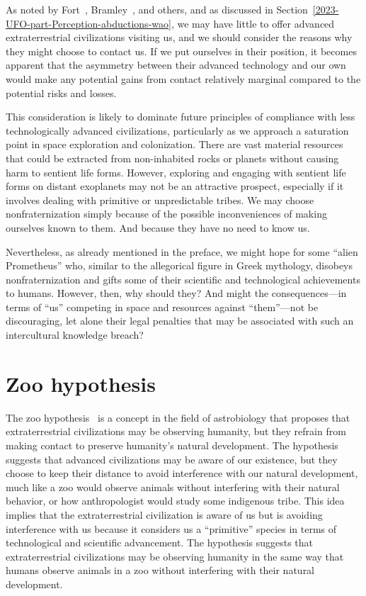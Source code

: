 As noted by Fort~\cite{FortBotD}, Bramley~\cite{Bramley1993Mar}, and others,
and as discussed in Section~\ref{2023-UFO-part-Perception-abductions-wao},
we may have little to offer advanced extraterrestrial civilizations visiting us,
and we should consider the reasons why they might choose to contact us.
If we put ourselves in their position, it becomes apparent that the asymmetry between their advanced technology
and our own would make any potential gains from contact relatively marginal compared to the potential risks and losses.

This consideration is likely to dominate future principles of compliance with less technologically advanced civilizations,
particularly as we approach a saturation point in space exploration and colonization.
There are vast material resources that could be extracted from non-inhabited rocks or planets without causing harm to sentient life forms.
However, exploring and engaging with sentient life forms on distant exoplanets may not be an attractive prospect,
especially if it involves dealing with primitive or unpredictable tribes.
We may choose nonfraternization simply because of the possible inconveniences of making ourselves known to them.
And because they have no need to know us.

Nevertheless, as already mentioned in the preface, we might hope for some ``alien Prometheus'' who,
similar to the allegorical figure in Greek mythology, disobeys nonfraternization and gifts some of their scientific and technological achievements to humans.
However, then, why should they?
And might the consequences---in terms of ``us'' competing in space and resources against ``them''---not be discouraging,
let alone their legal penalties that may be associated with such an intercultural knowledge breach?

\section{Zoo hypothesis}
\label{2023-UFO-part-Speculation-among-hypercivilization-zoo-hypothesis-zh}

The zoo hypothesis~\cite{Ball1973347} is a concept in the field of astrobiology that
proposes that extraterrestrial civilizations may be observing humanity, but they refrain from making contact
to preserve humanity's natural development.
The hypothesis suggests that advanced civilizations may be aware of our existence,
but they choose to keep their distance to avoid interference with our natural development,
much like a zoo would observe animals without interfering with their natural behavior,
or how anthropologist would study some indigenous tribe.
This idea implies that the extraterrestrial civilization is aware of us but is avoiding interference with us because it considers us a ``primitive'' species in terms of technological and scientific advancement. The hypothesis suggests that extraterrestrial civilizations may be observing humanity in the same way that humans observe animals in a zoo without interfering with their natural development.
